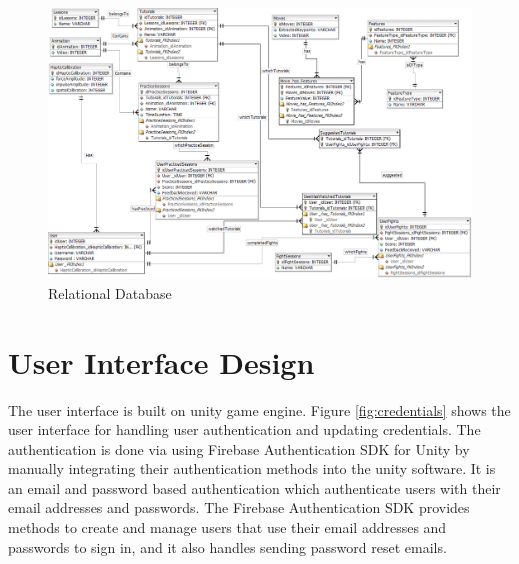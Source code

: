 \begin{figure}
    \centering
    \includegraphics[scale=0.38]{images/databaseDesign.png}
    \caption{Relational Database}
    \label{fig:RelationalDatabase}
\end{figure}


\section{User Interface Design}
The user interface is built on unity game engine. 
Figure \ref{fig:credentials} shows the user interface for handling user authentication and updating credentials. The authentication is done via using Firebase Authentication SDK for Unity by manually integrating their authentication methods into the unity software. It is an email and password based authentication which authenticate users with their email addresses and passwords. The Firebase Authentication SDK provides methods to create and manage users that use their email addresses and passwords to sign in, and it also handles sending password reset emails. 

